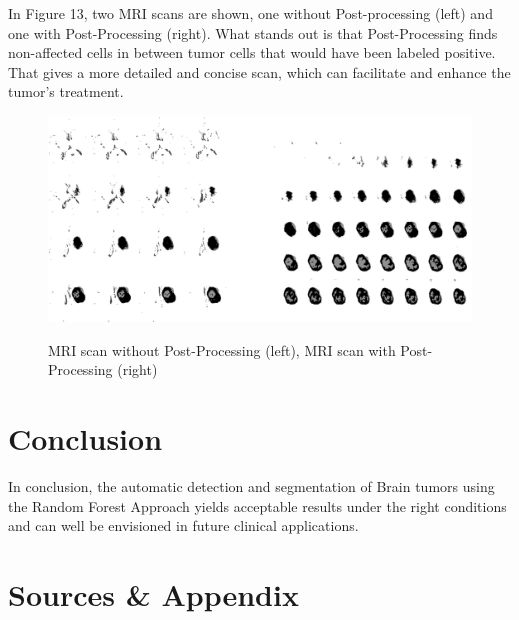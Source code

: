 \documentclass[
12pt,
headsepline,
bibliography=totoc,
twoside=semi,
fleqn
]{scrartcl}
\begin{document}
 In Figure 13, two MRI scans are shown, one without Post-processing (left) and one with Post-Processing (right). What stands out is that Post-Processing finds non-affected cells in between tumor cells that would have been labeled positive. That gives a more detailed and concise scan, which can facilitate and enhance the tumor's treatment. 

 \begin{figure}[H]
 \centering \includegraphics[scale=0.7]{BDT19.png}\label{fig:fig19}
 \caption{MRI scan without Post-Processing (left), MRI scan with Post-Processing (right)}
 \end{figure} 

\section{Conclusion\label{sec:sec5}}

 In conclusion, the automatic detection and segmentation of Brain tumors using the Random Forest Approach yields acceptable results under the right conditions and can well be envisioned in future clinical applications. 
\section{Sources \& Appendix\label{sec.sec5}}

\end{document}
